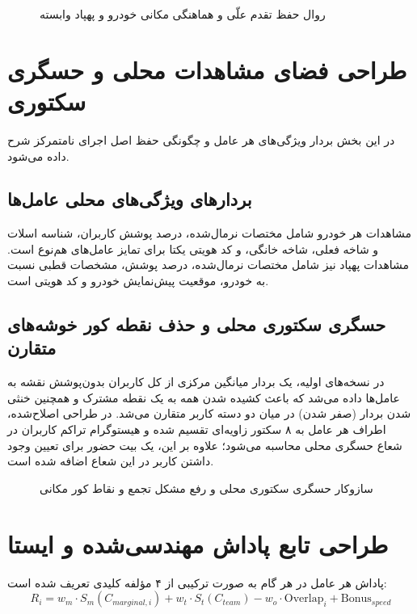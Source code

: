 \documentclass[a4paper,12pt,oneside]{report}
\begin{document}
\begin{figure}[H]
    \centering
    \caption{روال حفظ تقدم علّی و هماهنگی مکانی خودرو و پهپاد وابسته}
    \label{fig:causal_decision_flow}
\end{figure}

\section{طراحی فضای مشاهدات محلی و حسگری سکتوری}
در این بخش بردار ویژگی‌های هر عامل و چگونگی حفظ اصل اجرای نامتمرکز شرح داده می‌شود.

\subsection{بردارهای ویژگی‌های محلی عامل‌ها}
مشاهدات هر خودرو شامل مختصات نرمال‌شده، درصد پوشش کاربران، شناسه اسلات و شاخه فعلی، شاخه خانگی، و کد هویتی یکتا برای تمایز عامل‌های هم‌نوع است. مشاهدات پهپاد نیز شامل مختصات نرمال‌شده، درصد پوشش، مشخصات قطبی نسبت به خودرو، موقعیت پیش‌نمایش خودرو و کد هویتی است.

\subsection{حسگری سکتوری محلی و حذف نقطه کور خوشه‌های متقارن}
در نسخه‌های اولیه، یک بردار میانگین مرکزی از کل کاربران بدون‌پوشش نقشه به عامل‌ها داده می‌شد که باعث کشیده شدن همه به یک نقطه مشترک و همچنین خنثی شدن بردار (صفر شدن) در میان دو دسته کاربر متقارن می‌شد. در طراحی اصلاح‌شده، اطراف هر عامل به ۸ سکتور زاویه‌ای تقسیم شده و هیستوگرام تراکم کاربران در شعاع حسگری محلی محاسبه می‌شود؛ علاوه بر این، یک بیت حضور برای تعیین وجود داشتن کاربر در این شعاع اضافه شده است.

\begin{figure}[H]
    \centering
    \caption{سازوکار حسگری سکتوری محلی و رفع مشکل تجمع و نقاط کور مکانی}
    \label{fig:sector_sensing}
\end{figure}

\section{طراحی تابع پاداش مهندسی‌شده و ایستا}
پاداش هر عامل در هر گام به صورت ترکیبی از ۴ مؤلفه کلیدی تعریف شده است:
\begin{equation}
R_i = w_m \cdot S_m(C_{marginal, i}) + w_t \cdot S_t(C_{team}) - w_o \cdot \text{Overlap}_i + \text{Bonus}_{speed}
\end{equation}
\end{document}
